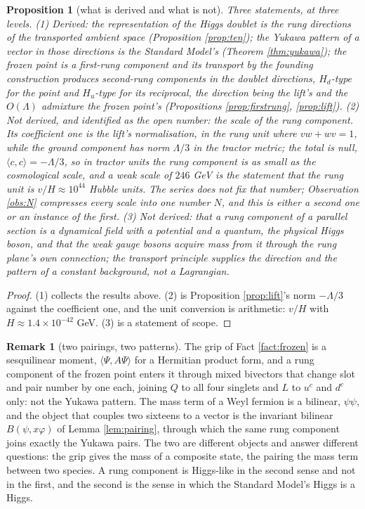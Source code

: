 \documentclass[11pt]{article}
\newtheorem{proposition}[theorem]{Proposition}
\theoremstyle{definition}
\newtheorem{remark}[theorem]{Remark}
\newcommand{\ip}[2]{\langle #1, #2\rangle}
\begin{document}
\begin{proposition}[what is derived and what is not]\label{prop:status}
Three statements, at three levels. (1) \emph{Derived:} the representation of the Higgs doublet is the rung directions of the transported ambient space (Proposition \ref{prop:ten}); the Yukawa pattern of a vector in those directions is the Standard Model's (Theorem \ref{thm:yukawa}); the frozen point is a first-rung component and its transport by the founding construction produces second-rung components in the doublet directions, $H_{d}$-type for the point and $H_{u}$-type for its reciprocal, the direction being the lift's and the $O(\Lambda)$ admixture the frozen point's (Propositions \ref{prop:firstrung}, \ref{prop:lift}). (2) \emph{Not derived, and identified as the open number:} the scale of the rung component. Its coefficient one is the lift's normalisation, in the rung unit where $vw + wv = 1$, while the ground component has norm $\Lambda/3$ in the tractor metric; the total is null, $\ip{c}{c} = -\Lambda/3$, so in tractor units the rung component is as small as the cosmological scale, and a weak scale of $246$ GeV is the statement that the rung unit is $v/H \approx 10^{44}$ Hubble units. The series does not fix that number; Observation \ref{obs:N} compresses every scale into one number $N$, and this is either a second one or an instance of the first. (3) \emph{Not derived:} that a rung component of a parallel section is a dynamical field with a potential and a quantum, the physical Higgs boson, and that the weak gauge bosons acquire mass from it through the rung plane's own connection; the transport principle supplies the direction and the pattern of a constant background, not a Lagrangian.
\end{proposition}

\begin{proof}
(1) collects the results above. (2) is Proposition \ref{prop:lift}'s norm $-\Lambda/3$ against the coefficient one, and the unit conversion is arithmetic: $v/H$ with $H \approx 1.4 \times 10^{-42}$ GeV. (3) is a statement of scope.
\end{proof}

\begin{remark}[two pairings, two patterns]\label{rem:pairings}
The grip of Fact \ref{fact:frozen} is a sesquilinear moment, $\ip{\Psi}{A\Psi}$ for a Hermitian product form, and a rung component of the frozen point enters it through mixed bivectors that change slot and pair number by one each, joining $Q$ to all four singlets and $L$ to $u^{c}$ and $d^{c}$ only: not the Yukawa pattern. The mass term of a Weyl fermion is a bilinear, $\psi\psi$, and the object that couples two sixteens to a vector is the invariant bilinear $B(\psi, x\varphi)$ of Lemma \ref{lem:pairing}, through which the same rung component joins exactly the Yukawa pairs. The two are different objects and answer different questions: the grip gives the mass of a composite state, the pairing the mass term between two species. A rung component is Higgs-like in the second sense and not in the first, and the second is the sense in which the Standard Model's Higgs is a Higgs.
\end{remark}
\end{document}
